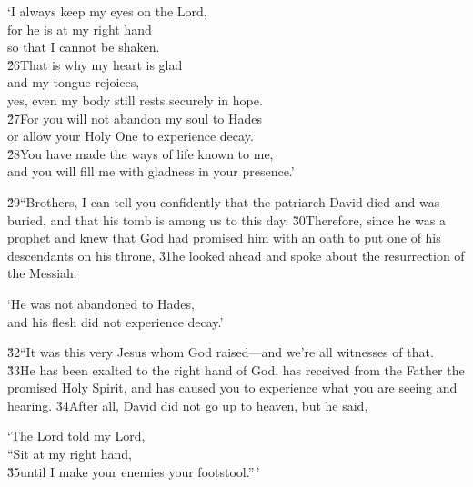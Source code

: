 \begin{poetry}
\poeml `I always keep my eyes on the Lord, \\
\poemll    for he is at my right hand \\
\poemlll       so that I cannot be shaken. \\
\poeml \v{26}That is why my heart is glad \\
\poemll    and my tongue rejoices, \\
\poemlll       yes, even my body still rests securely in hope. \\
\poeml \v{27}For you will not abandon my soul to Hades \\
\poemll    or allow your Holy One to experience decay. \\
\poeml \v{28}You have made the ways of life known to me, \\
\poemll    and you will fill me with gladness in your presence.'
\end{poetry}

\v{29}``Brothers, I can tell you confidently that the patriarch David died and was buried, and that his tomb is among us to this day. \v{30}Therefore, since he was a prophet and knew that God had promised him with an oath to put one of his descendants on his throne, \v{31}he looked ahead and spoke about the resurrection of the Messiah:

\begin{poetry}
\poeml `He was not abandoned to Hades, \\
\poemll    and his flesh did not experience decay.'
\end{poetry}

\v{32}``It was this very Jesus whom God raised---and we're all witnesses of that. \v{33}He has been exalted to the right hand of God, has received from the Father the promised Holy Spirit, and has caused you to experience what you are seeing and hearing. \v{34}After all, David did not go up to heaven, but he said,

\begin{poetry}
\poeml `The Lord told my Lord, \\
\poemll    ``Sit at my right hand, \\
\poeml \v{35}until I make your enemies your footstool.''\,'
\end{poetry}

